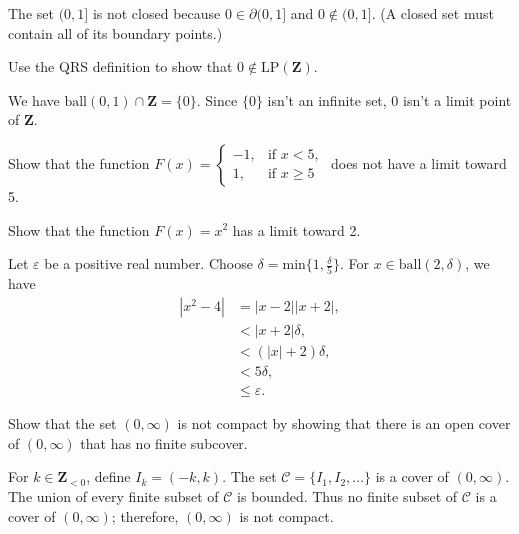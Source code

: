 \documentclass[12pt,fleqn]{exam}
\newcommand{\ball}{\mathrm{ball}}
\newcommand{\integers}{\mathbf{Z}}
\newcommand{\LP}{\mathrm{LP}}
\begin{document}
\begin{questions}
\begin{solution}
\quad The set  \((0,1]\) is not closed because \(0 \in
 \partial(0,1]\) and \(0 \notin (0,1] \). (A closed set
must contain all of its boundary points.)
\end{solution}

\question  Use the QRS definition to show that \(0 \not \in  \LP(\integers)\).

\begin{solution}
We have \(\ball(0,1) \cap \integers = \{0\}\). Since
\(\{0\}\) isn't an infinite set, 0 isn't a limit point of \(\integers\).
\end{solution}


\question  Show that the function
\(\displaystyle
  F(x) = \begin{cases} -1, & \mbox{if } x < 5, \\
                        1, & \mbox{if } x \geq 5
         \end{cases}
\)
does not have a limit toward 5.



\question   Show that the function \(F(x) = x^2\) has a limit
toward 2.
\begin{solution}
Let \(\varepsilon\) be a positive real number.  Choose
\(\delta = \mbox{min} \{1, \frac{\delta}{5} \}\).  For \(x \in
\ball(2,\delta)\), we have
\begin{align*}
  | x^2 - 4 | &= |x -2| |x + 2|, \\
              &< |x + 2| \delta, \\
              &< (|x| + 2) \delta, \\
              &< 5 \delta, \\
              &\leq \varepsilon.
\end{align*}
\end{solution}

\question   Show that the set \((0,\infty)\) is not compact by 
showing that there is an open cover of \((0,\infty)\) that has no
finite subcover.

\begin{solution}
 For \(k \in \integers_{<0}\), define \(I_k = (-k,k)\).
The set \(\mathcal{C} = \{I_1, I_2, \dots \}\) is a cover of 
\((0,\infty)\).  The union of every finite subset of \(\mathcal{C}\)
is bounded. Thus no finite subset of \(\mathcal{C}\) is a cover of
\((0,\infty)\); therefore, \((0,\infty)\) is not compact.
\end{solution}


\end{questions}
\end{document}
